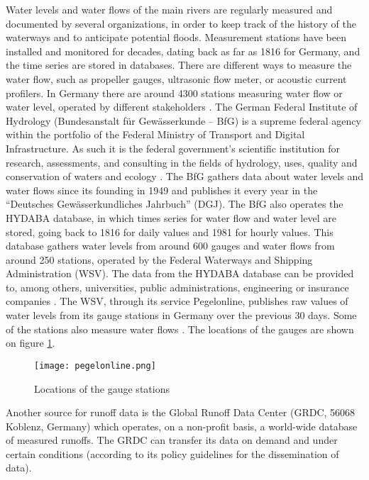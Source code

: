Water levels and water flows of the main rivers are regularly measured and documented by several organizations, in order to keep track of the history of the waterways and to anticipate potential floods. Measurement stations have been installed and monitored for decades, dating back as far as 1816 for Germany, and the time series are stored in databases. There are different ways to measure the water flow, such as propeller gauges, ultrasonic flow meter, or acoustic current profilers. In Germany there are around 4300 stations measuring water flow or water level, operated by different stakeholders \cite{bafg_hyd}.  The German Federal Institute of Hydrology (Bundesanstalt für Gewässerkunde – BfG) is a supreme federal agency within the portfolio of the Federal Ministry of Transport and Digital Infrastructure. As such it is the federal government's scientific institution for research, assessments, and consulting in the fields of hydrology, uses, quality and conservation of waters and ecology \cite{bafg}. The BfG gathers data about water levels and water flows since its founding in 1949 and publishes it every year in the ``Deutsches Gewässerkundliches Jahrbuch'' (DGJ). The BfG also operates the HYDABA database, in which times series for water flow and water level are stored, going back to 1816 for daily values and 1981 for hourly values. This database gathers water levels from around 600 gauges and water flows from around 250 stations, operated by the Federal Waterways and Shipping Administration (WSV). The data from the HYDABA database can be provided to, among others, universities, public administrations, engineering or insurance companies \cite{bafg_hyd}. \newline
The WSV, through its service Pegelonline, publishes raw values of water levels from its gauge stations in Germany over the previous 30 days. Some of the stations also measure water flows \cite{pegelonline}. The locations of the gauges are shown on figure \ref{pegelonline}.

\begin{figure}[H]
\centering
\texttt{[image: pegelonline.png]}
\caption[Locations of the gauge stations]{Locations of the gauge stations \cite{pegelonline}}
\label{pegelonline}
\end{figure}

Another source for runoff data is the Global Runoff Data Center (GRDC, 56068 Koblenz, Germany) which operates, on a non-profit basis, a world-wide database of measured runoffs. The GRDC can transfer its data on demand and under certain conditions (according to its policy guidelines for the dissemination of data).\newline

